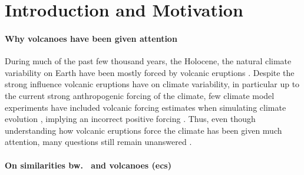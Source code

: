 \documentclass[twocol]{ametsocV5}
\begin{document}
\section{Introduction and Motivation}

\paragraph*{Why volcanoes have been given attention}

During much of the past few thousand years, the Holocene, the natural climate
variability on Earth have been mostly forced by volcanic eruptions \citep{sigl2022}.
Despite the strong influence volcanic eruptions have on climate variability, in
particular up to the current strong anthropogenic forcing of the climate, few climate
model experiments have included volcanic forcing estimates when simulating climate
evolution \citep{sigl2022}, implying an incorrect positive forcing \citep{gregory2016}.
Thus, even though understanding how volcanic eruptions force the climate has been given
much attention, many questions still remain unanswered
\citep[e.g.,][]{robock2000,zanchettin2019,marshall2022}.


\paragraph*{On similarities bw.\  and volcanoes (\acrshort{ecs})}
\end{document}
